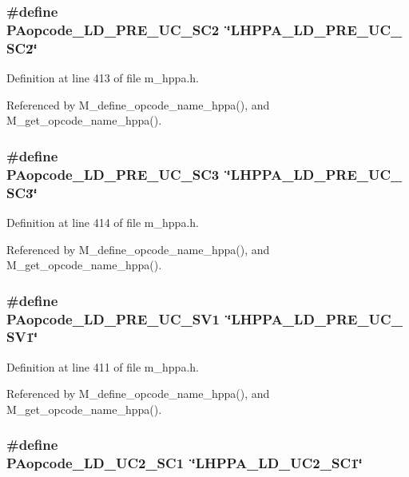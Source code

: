\subsubsection{\setlength{\rightskip}{0pt plus 5cm}\#define PAopcode\_\-LD\_\-PRE\_\-UC\_\-SC2~\char`\"{}LHPPA\_\-LD\_\-PRE\_\-UC\_\-SC2\char`\"{}}\label{m__hppa_8h_2e43912bd5adf128b6474e4764a81eb8}




Definition at line 413 of file m\_\-hppa.h.

Referenced by M\_\-define\_\-opcode\_\-name\_\-hppa(), and M\_\-get\_\-opcode\_\-name\_\-hppa().
\subsubsection{\setlength{\rightskip}{0pt plus 5cm}\#define PAopcode\_\-LD\_\-PRE\_\-UC\_\-SC3~\char`\"{}LHPPA\_\-LD\_\-PRE\_\-UC\_\-SC3\char`\"{}}\label{m__hppa_8h_bd9673400b7e404a0f2130071736f4ae}




Definition at line 414 of file m\_\-hppa.h.

Referenced by M\_\-define\_\-opcode\_\-name\_\-hppa(), and M\_\-get\_\-opcode\_\-name\_\-hppa().
\subsubsection{\setlength{\rightskip}{0pt plus 5cm}\#define PAopcode\_\-LD\_\-PRE\_\-UC\_\-SV1~\char`\"{}LHPPA\_\-LD\_\-PRE\_\-UC\_\-SV1\char`\"{}}\label{m__hppa_8h_847ab7d6f2e6fb4365c35fe4d3378539}




Definition at line 411 of file m\_\-hppa.h.

Referenced by M\_\-define\_\-opcode\_\-name\_\-hppa(), and M\_\-get\_\-opcode\_\-name\_\-hppa().
\subsubsection{\setlength{\rightskip}{0pt plus 5cm}\#define PAopcode\_\-LD\_\-UC2\_\-SC1~\char`\"{}LHPPA\_\-LD\_\-UC2\_\-SC1\char`\"{}}\label{m__hppa_8h_173a6d727ba25f924981067216cb35a0}




